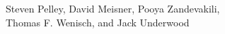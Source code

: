



\newcommand{\fix}{ {\bf \textcolor{red}{FIXME} }}


\newcommand{\PowerRouting}{Power Routing\xspace}

\newcommand{\MACClong}{Scientific Computing Data Center}
\newcommand{\MACC}{SCDC}

\newcommand{\field}[1]{\mathbb{#1}}


\newenvironment{packed_itemize}{
\begin{itemize}
  \setlength{\topsep}{0pt}
  \setlength{\partopsep}{0pt}
  \setlength{\itemsep}{0pt}
  \setlength{\parskip}{0pt}
  \setlength{\parsep}{0pt}
}{\end{itemize}}

{
\centering
Steven Pelley, David Meisner, Pooya Zandevakili, \\
Thomas F. Wenisch, and Jack Underwood \\
\vspace{2\baselineskip}
}

